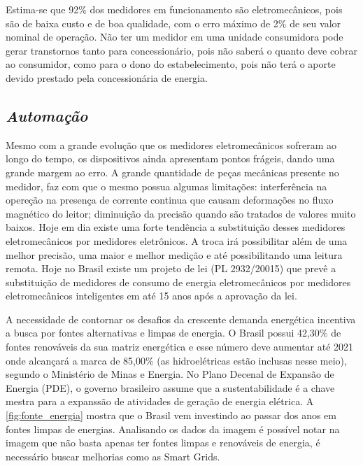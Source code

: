 Estima-se que 92\% dos medidores em funcionamento são eletromecânicos, pois são de baixa custo e de boa qualidade, com o erro máximo de 2\% de seu valor
nominal de operação. Não ter um medidor em uma unidade consumidora pode gerar transtornos tanto para concessionário, pois não saberá o quanto deve cobrar ao 
consumidor, como para o dono do estabelecimento, pois não terá o aporte devido prestado pela concessionária de energia.

\subsection[\textit{Automação}]{\textit{Automação}}\label{automacao}
Mesmo com a grande evolução que os medidores eletromecânicos sofreram ao longo do tempo, os dispositivos ainda apresentam pontos frágeis, dando uma 
grande margem ao erro. A grande quantidade de peças mecânicas presente no medidor, faz com que o mesmo possua algumas limitações: interferência na
opereção na presença de corrente continua que causam deformações no fluxo magnético do leitor; diminuição da precisão quando são tratados de valores
muito baixos. Hoje em dia existe uma forte tendência a substituição desses medidores eletromecânicos por medidores eletrônicos. A troca irá possibilitar além de uma
melhor precisão, uma maior e melhor medição e até possibilitando uma leitura remota. Hoje no Brasil existe um projeto de lei (PL 2932/20015) que prevê
a substituição de medidores de consumo de energia eletromecânicos por medidores eletromecânicos inteligentes em até 15 anos após a aprovação da lei.


A necessidade de contornar os desafios da crescente demanda energética incentiva a busca por fontes alternativas e limpas de energia. O Brasil 
possui 42,30\% de fontes renováveis da sua matriz energética e esse número deve aumentar até 2021 onde alcançará a marca de 85,00\% (as hidroelétricas
estão inclusas nesse meio), segundo o Ministério de Minas e Energia. No Plano Decenal de Expansão de Energia (PDE), o governo brasileiro
assume que a sustentabilidade é a chave mestra para a expanssão de atividades de geração de energia elétrica. A \autoref{fig:fonte_energia} mostra
que o Brasil vem investindo ao passar dos anos em fontes limpas de energias. Analisando os dados da imagem é possível notar na imagem que não basta apenas ter fontes limpas
e renováveis de energia, é necessário buscar melhorias como as Smart Grids.

